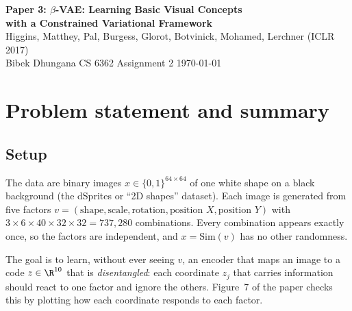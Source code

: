 

\begin{center}
  {\LARGE\bfseries Paper 3: $\beta$-VAE: Learning Basic Visual Concepts\\[2pt] with a Constrained Variational Framework}\\[5pt]
  {\large Higgins, Matthey, Pal, Burgess, Glorot, Botvinick, Mohamed, Lerchner (ICLR 2017)}\\[4pt]
  Bibek Dhungana \quad\textbar\quad CS 6362 Assignment 2 \quad\textbar\quad \today
\end{center}

\section{Problem statement and summary}

\subsection{Setup}
The data are binary images $x\in\{0,1\}^{64\times64}$ of one white shape on a black background (the dSprites or ``2D shapes'' dataset). Each image is generated from five factors $v=(\text{shape},\text{scale},\text{rotation},\text{position }X,\text{position }Y)$ with $3\times6\times40\times32\times32=737{,}280$ combinations. Every combination appears exactly once, so the factors are independent, and $x=\mathrm{Sim}(v)$ has no other randomness.

The goal is to learn, without ever seeing $v$, an encoder that maps an image to a code $z\in\R^{10}$ that is \emph{disentangled}: each coordinate $z_j$ that carries information should react to one factor and ignore the others. Figure~7 of the paper checks this by plotting how each coordinate responds to each factor.

